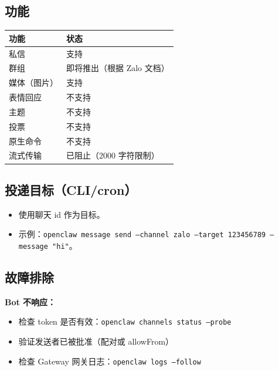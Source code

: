 \subsection{功能}



\begin{table}[h]
\centering
\small
\begin{tabular}{|l|l|}
\hline
功能 & 状态 \\
\hline
私信 & \emoji{✅} 支持 \\
\hline
群组 & \emoji{❌} 即将推出（根据 Zalo 文档） \\
\hline
媒体（图片） & \emoji{✅} 支持 \\
\hline
表情回应 & \emoji{❌} 不支持 \\
\hline
主题 & \emoji{❌} 不支持 \\
\hline
投票 & \emoji{❌} 不支持 \\
\hline
原生命令 & \emoji{❌} 不支持 \\
\hline
流式传输 & \emoji{⚠} 已阻止（2000 字符限制） \\
\hline
\end{tabular}
\end{table}



\subsection{投递目标（CLI/cron）}


\begin{itemize}
  \item 使用聊天 id 作为目标。
  \item 示例：\texttt{openclaw message send --channel zalo --target 123456789 --message "hi"}。
\end{itemize}


\subsection{故障排除}


\textbf{Bot 不响应：}

\begin{itemize}
  \item 检查 token 是否有效：\texttt{openclaw channels status --probe}
  \item 验证发送者已被批准（配对或 allowFrom）
  \item 检查 Gateway 网关日志：\texttt{openclaw logs --follow}
\end{itemize}



